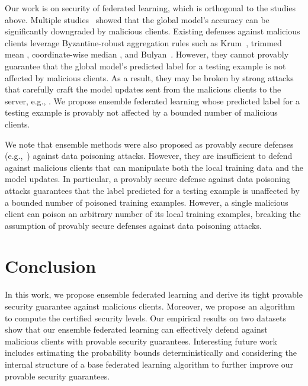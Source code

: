 \documentclass[letterpaper]{article} %
\begin{document}
Our work is on  security of federated learning, which is orthogonal to the studies above. Multiple studies~\cite{fang2019local,Bagdasaryan18,Xie19,Bhagoji19} showed that the  global model's accuracy can be significantly downgraded by malicious clients. Existing defenses against malicious clients leverage Byzantine-robust aggregation rules such as Krum~\cite{Blanchard17}, trimmed mean \cite{Yin18},  coordinate-wise median \cite{Yin18}, and Bulyan~\cite{Mhamdi18}. However, they cannot provably guarantee that the global model's predicted label for a testing example is not affected by malicious clients. As a result, they may be broken by strong attacks that carefully craft the model updates sent from the malicious clients to the server, e.g., \cite{fang2019local}. We propose ensemble federated learning whose predicted label for a testing example is provably not affected by a bounded number of malicious clients. 

We note that ensemble methods were also proposed as provably secure defenses (e.g.,~\cite{jia2020intrinsic}) against data poisoning attacks. However, they are insufficient to defend against malicious clients that can manipulate both the local training data and the model updates. In particular, a provably secure defense against data poisoning attacks guarantees that the label predicted for a testing example is unaffected by a bounded number of poisoned training examples. However, a single malicious client can poison an arbitrary number of its local training examples, breaking the assumption of provably secure defenses against data poisoning attacks. 


\section{Conclusion}
In this work, we propose ensemble federated learning and derive its tight provable security guarantee against malicious clients. Moreover, we propose an algorithm to compute the certified security levels. Our empirical results on two datasets show that our ensemble federated learning can effectively defend against malicious clients with provable security guarantees.  Interesting future work includes estimating the probability bounds deterministically and considering the internal structure of a base federated learning algorithm to further improve our provable security guarantees. 

\end{document}
